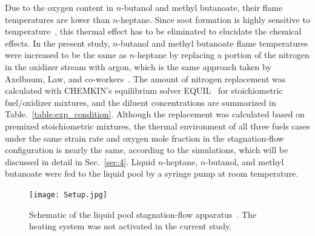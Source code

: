 \documentclass[review,3p,times]{elsarticleUS}
\begin{document}
Due to the oxygen content in $n$-butanol and methyl butanoate, their flame temperatures are lower than $n$-heptane. Since soot formation is highly sensitive to temperature~\cite{wang11}, this thermal effect has to be eliminated to elucidate the chemical effects. In the present study, $n$-butanol and methyl butanoate flame temperatures were increased to be the same as $n$-heptane by replacing a portion of the nitrogen in the oxidizer stream with argon, which is the same approach taken by Axelbaum, Law, and co-workers~\cite{du89,du91,axelbaum91}. The amount of nitrogen replacement was calculated with CHEMKIN's equilibrium solver EQUIL~\cite{chemkin} for stoichiometric fuel/oxidizer mixtures, and the diluent concentrations are summarized in Table.~\ref{table:exp_condition}.  Although the replacement was calculated based on premixed stoichiometric mixtures, the thermal environment of all three fuels cases under the same strain rate and oxygen mole fraction in the stagnation-flow configuration is nearly the same, according to the simulations, which will be discussed in detail in Sec.~\ref{sec:4}.  Liquid $n$-heptane, $n$-butanol, and methyl butanoate were fed to the liquid pool by a syringe pump at room temperature.

\begin{figure}[t]
  \centering
  \scriptsize
  \texttt{[image: Setup.jpg]}
  \normalsize
  \caption{Schematic of the liquid pool stagnation-flow apparatus~\cite{liu10}.  The heating system was not activated in the current study.}
  \label{fig:setup}
\end{figure}
\end{document}
